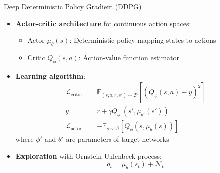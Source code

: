 \documentclass{beamer}
\begin{document}
\begin{frame}{Deep Deterministic Policy Gradient (DDPG)}
\begin{itemize}
    \item \textbf{Actor-critic architecture} for continuous action spaces:
    \begin{itemize}
        \item Actor $\mu_\theta(s)$: Deterministic policy mapping states to actions
        \item Critic $Q_\phi(s,a)$: Action-value function estimator
    \end{itemize}
    
    \item \textbf{Learning algorithm}:
    \begin{align}
    \mathcal{L}_{\text{critic}} &= \mathbb{E}_{(s,a,r,s') \sim \mathcal{D}}\left[(Q_\phi(s,a) - y)^2\right] \\
    y &= r + \gamma Q_{\phi'}(s', \mu_{\theta'}(s')) \\
    \mathcal{L}_{\text{actor}} &= -\mathbb{E}_{s \sim \mathcal{D}}\left[ Q_\phi(s,\mu_\theta(s))\right]
    \end{align}
    where $\phi'$ and $\theta'$ are parameters of target networks
    
    \item \textbf{Exploration} with Ornstein-Uhlenbeck process:
    \begin{equation}
    a_t = \mu_\theta(s_t) + \mathcal{N}_t
    \end{equation}
\end{itemize}
\end{frame}
\end{document}
